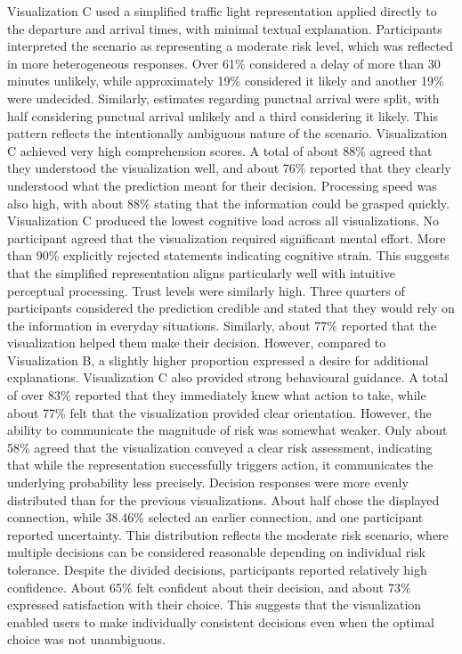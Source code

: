\documentclass[final,journal,a4paper]{IEEEtran}
\begin{document}
Visualization C used a simplified traffic light representation applied directly to the departure and arrival times, with minimal textual explanation. Participants interpreted the scenario as representing a moderate risk level, which was reflected in more heterogeneous responses. Over 61\% considered a delay of more than 30 minutes unlikely, while approximately 19\% considered it likely and another 19\% were undecided. Similarly, estimates regarding punctual arrival were split, with half considering punctual arrival unlikely and a third considering it likely. This pattern reflects the intentionally ambiguous nature of the scenario. Visualization C achieved very high comprehension scores. A total of about 88\% agreed that they understood the visualization well, and about 76\% reported that they clearly understood what the prediction meant for their decision. Processing speed was also high, with about 88\% stating that the information could be grasped quickly. Visualization C produced the lowest cognitive load across all visualizations. No participant agreed that the visualization required significant mental effort. More than 90\% explicitly rejected statements indicating cognitive strain. This suggests that the simplified representation aligns particularly well with intuitive perceptual processing. Trust levels were similarly high. Three quarters of participants considered the prediction credible and stated that they would rely on the information in everyday situations. Similarly, about 77\% reported that the visualization helped them make their decision. However, compared to Visualization B, a slightly higher proportion expressed a desire for additional explanations. Visualization C also provided strong behavioural guidance. A total of over 83\% reported that they immediately knew what action to take, while about 77\% felt that the visualization provided clear orientation. However, the ability to communicate the magnitude of risk was somewhat weaker. Only about 58\% agreed that the visualization conveyed a clear risk assessment, indicating that while the representation successfully triggers action, it communicates the underlying probability less precisely. Decision responses were more evenly distributed than for the previous visualizations. About half chose the displayed connection, while 38.46\% selected an earlier connection, and one participant reported uncertainty. This distribution reflects the moderate risk scenario, where multiple decisions can be considered reasonable depending on individual risk tolerance. Despite the divided decisions, participants reported relatively high confidence. About 65\% felt confident about their decision, and about 73\% expressed satisfaction with their choice. This suggests that the visualization enabled users to make individually consistent decisions even when the optimal choice was not unambiguous.
\end{document}
